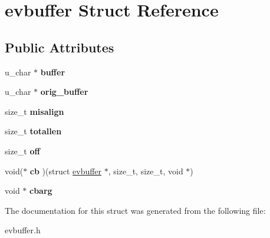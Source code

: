 \hypertarget{structevbuffer}{
\section{evbuffer Struct Reference}
\label{structevbuffer}
}
\subsection*{Public Attributes}
\begin{DoxyCompactItemize}
\item 
\hypertarget{structevbuffer_aa48cd5c1ef3b8e98feb730ed2238f577}{
u\_\-char $\ast$ {\bfseries buffer}}
\label{structevbuffer_aa48cd5c1ef3b8e98feb730ed2238f577}

\item 
\hypertarget{structevbuffer_ae5e09e684908ac7a3f80e6ec603caec6}{
u\_\-char $\ast$ {\bfseries orig\_\-buffer}}
\label{structevbuffer_ae5e09e684908ac7a3f80e6ec603caec6}

\item 
\hypertarget{structevbuffer_ad64c4cd9d94a6e407d762afc2e823504}{
size\_\-t {\bfseries misalign}}
\label{structevbuffer_ad64c4cd9d94a6e407d762afc2e823504}

\item 
\hypertarget{structevbuffer_ab6c10262b029181e975d199e278572e8}{
size\_\-t {\bfseries totallen}}
\label{structevbuffer_ab6c10262b029181e975d199e278572e8}

\item 
\hypertarget{structevbuffer_a2b5ddeec6b6b2596c93d2842074dd5c5}{
size\_\-t {\bfseries off}}
\label{structevbuffer_a2b5ddeec6b6b2596c93d2842074dd5c5}

\item 
\hypertarget{structevbuffer_a3a1fbd3a50d44ff6c2618968c893c644}{
void($\ast$ {\bfseries cb} )(struct \hyperlink{structevbuffer}{evbuffer} $\ast$, size\_\-t, size\_\-t, void $\ast$)}
\label{structevbuffer_a3a1fbd3a50d44ff6c2618968c893c644}

\item 
\hypertarget{structevbuffer_abfb320e497d3addf3e16e12f2d7034b5}{
void $\ast$ {\bfseries cbarg}}
\label{structevbuffer_abfb320e497d3addf3e16e12f2d7034b5}

\end{DoxyCompactItemize}


The documentation for this struct was generated from the following file:\begin{DoxyCompactItemize}
\item 
evbuffer.h\end{DoxyCompactItemize}
